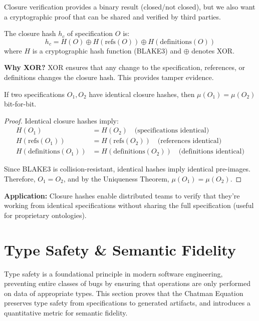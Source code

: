 Closure verification provides a binary result (closed/not closed), but we also want a cryptographic proof that can be shared and verified by third parties.

\begin{definition}
    The closure hash \(h_c\) of specification \(O\) is:
    \begin{equation}
        h_c = H(O) \oplus H(\text{refs}(O)) \oplus H(\text{definitions}(O))
    \end{equation}
    where \(H\) is a cryptographic hash function (BLAKE3) and \(\oplus\) denotes XOR.
\end{definition}

\textbf{Why XOR?} XOR ensures that any change to the specification, references, or definitions changes the closure hash. This provides tamper evidence.

\begin{corollary}
    If two specifications \(O_1, O_2\) have identical closure hashes, then \(\mu(O_1) = \mu(O_2)\) bit-for-bit.
\end{corollary}

\begin{proof}
    Identical closure hashes imply:
    \begin{align}
        H(O_1) &= H(O_2) \quad \text{(specifications identical)} \\
        H(\text{refs}(O_1)) &= H(\text{refs}(O_2)) \quad \text{(references identical)} \\
        H(\text{definitions}(O_1)) &= H(\text{definitions}(O_2)) \quad \text{(definitions identical)}
    \end{align}

    Since BLAKE3 is collision-resistant, identical hashes imply identical pre-images. Therefore, \(O_1 = O_2\), and by the Uniqueness Theorem, \(\mu(O_1) = \mu(O_2)\).
\end{proof}

\textbf{Application:} Closure hashes enable distributed teams to verify that they're working from identical specifications without sharing the full specification (useful for proprietary ontologies).

\section{Type Safety \& Semantic Fidelity}

Type safety is a foundational principle in modern software engineering, preventing entire classes of bugs by ensuring that operations are only performed on data of appropriate types. This section proves that the Chatman Equation preserves type safety from specifications to generated artifacts, and introduces a quantitative metric for semantic fidelity.

